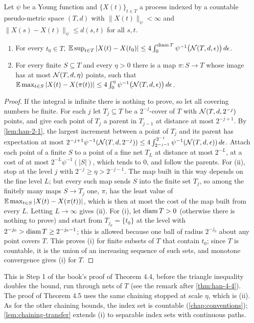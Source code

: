 \begin{lemma}
  \label{lem:chaining-one-sided}
  Let $\psi$ be a Young function and $\{X(t)\}_{t\in T}$ a process indexed by a countable pseudo-metric space $(T,d)$ with $\|X(t)\|_\psi<\infty$ and $\|X(s)-X(t)\|_\psi\le d(s,t)$ for all $s,t$.
  \begin{enumerate}
    \item[(i)] For every $t_0\in T$,
    $\mathbb{E}\sup_{t\in T}|X(t)-X(t_0)|\le4\int_0^{\operatorname{diam} T}\psi^{-1}\bigl(\mathcal{N}(T,d,\epsilon)\bigr)\,d\epsilon$.
    \item[(ii)] For every finite $S\subseteq T$ and every $\eta>0$ there is a map $\pi:S\to T$ whose image has at most $\mathcal{N}(T,d,\eta)$ points, such that
    $\mathbb{E}\max_{t\in S}|X(t)-X(\pi(t))|\le4\int_0^\eta\psi^{-1}\bigl(\mathcal{N}(T,d,\epsilon)\bigr)\,d\epsilon$.
  \end{enumerate}
\end{lemma}
\begin{proof}
  If the integral is infinite there is nothing to prove, so let all covering numbers be finite. For each $j$ let $T_j\subseteq T$ be a $2^{-j}$-cover of $T$ with $\mathcal{N}(T,d,2^{-j})$ points, and give each point of $T_j$ a parent in $T_{j-1}$ at distance at most $2^{-j+1}$. By \cref{lem:han-2-1}, the largest increment between a point of $T_j$ and its parent has expectation at most $2^{-j+1}\psi^{-1}(\mathcal{N}(T,d,2^{-j}))\le4\int_{2^{-j-1}}^{2^{-j}}\psi^{-1}(\mathcal{N}(T,d,\epsilon))\,d\epsilon$. Attach each point of a finite $S$ to a point of a fine net $T_L$ at distance at most $2^{-L}$, at a cost of at most $2^{-L}\psi^{-1}(|S|)$, which tends to $0$, and follow the parents. For (ii), stop at the level $j$ with $2^{-j}\ge\eta>2^{-j-1}$. The map built in this way depends on the fine level $L$; but every such map sends $S$ into the finite set $T_j$, so among the finitely many maps $S\to T_j$ one, $\pi$, has the least value of $\mathbb{E}\max_{t\in S}|X(t)-X(\pi(t))|$, which is then at most the cost of the map built from every $L$. Letting $L\to\infty$ gives (ii). For (i), let $\operatorname{diam} T>0$ (otherwise there is nothing to prove) and start from $T_{j_0}=\{t_0\}$ at the level with $2^{-j_0}>\operatorname{diam} T\ge2^{-j_0-1}$; this is allowed because one ball of radius $2^{-j_0}$ about any point covers $T$. This proves (i) for finite subsets of $T$ that contain $t_0$; since $T$ is countable, it is the union of an increasing sequence of such sets, and monotone convergence gives (i) for $T$.
\end{proof}
\begin{remark}
  This is Step 1 of the book's proof of Theorem 4.4, before the triangle inequality doubles the bound, run through nets of $T$ (see the remark after \cref{thm:han-4-4}). The proof of Theorem 4.5 uses the same chaining stopped at scale $\eta$, which is (ii). As for the other chaining bounds, the index set is countable (\cref{chap:conventions}); \cref{lem:chaining-transfer} extends (i) to separable index sets with continuous paths.
\end{remark}

